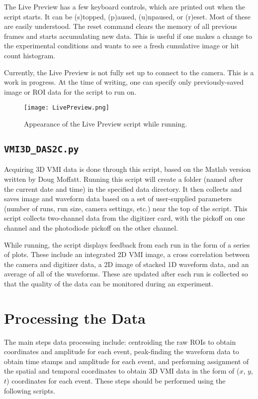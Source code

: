 \documentclass[12pt]{article}
\begin{document}
The Live Preview has a few keyboard controls, which are printed out when the script starts.
It can be (s)topped, (p)aused, (u)npaused, or (r)eset.
Most of these are easily understood.
The reset command clears the memory of all previous frames and starts accumulating new data.
This is useful if one makes a change to the experimental conditions and wants to see a fresh cumulative image or hit count histogram.

Currently, the Live Preview is not fully set up to connect to the camera.
This is a work in progress.
At the time of writing, one can specify only previously-saved image or ROI data for the script to run on.
 
\begin{figure}
\centering
\texttt{[image: LivePreview.png]}
\caption{
Appearance of the Live Preview script while running.
}\label{fig:LivePreview}
\end{figure}
 
\subsection{\texttt{VMI3D\_DAS2C.py}}

Acquiring 3D VMI data is done through this script, based on the Matlab version written by Doug Moffatt.
Running this script will create a folder (named after the current date and time) in the specified data directory.
It then collects and saves image and waveform data based on a set of user-supplied parameters (number of runs, run size, camera settings, etc.) near the top of the script.
This script collects two-channel data from the digitizer card, with the pickoff on one channel and the photodiode pickoff on the other channel.

While running, the script displays feedback from each run in the form of a series of plots.
These include an integrated 2D VMI image, a cross correlation between the camera and digitizer data, a 2D image of stacked 1D waveform data, and an average of all of the waveforms.
These are updated after each run is collected so that the quality of the data can be monitored during an experiment.

\section{Processing the Data}

The main steps data processing include: centroiding the raw ROIs to obtain coordinates and amplitude for each event, peak-finding the waveform data to obtain time stamps and amplitude for each event, and performing assignment of the spatial and temporal coordinates to obtain 3D VMI data in the form of ($x$, $y$, $t$) coordinates for each event.
These steps should be performed using the following scripts.
\end{document}
